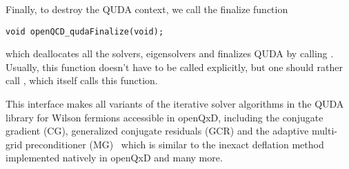 



Finally, to destroy the QUDA context, we call the finalize function
\begin{verbatim}
void openQCD_qudaFinalize(void);
\end{verbatim}
which deallocates all the solvers, eigensolvers and finalizes QUDA by calling . Usually, this function doesn't have to be called explicitly, but one should rather call , which itself calls this function.

This interface makes all variants of the iterative solver algorithms in the QUDA library for Wilson fermions accessible in openQxD, including the conjugate gradient (CG), generalized conjugate residuals (GCR) and the adaptive multi-grid preconditioner (MG)~\cite{Babich:2010qb} which is similar to the inexact deflation method implemented natively in openQxD and many more.

